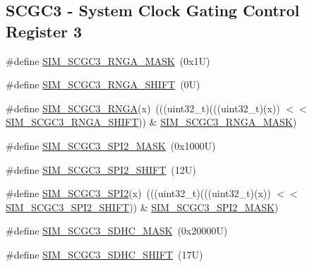 \subsection*{S\+C\+G\+C3 -\/ System Clock Gating Control Register 3}
\begin{DoxyCompactItemize}
\item 
\#define \mbox{\hyperlink{group___s_i_m___register___masks_ga0c6dcbbbc5311ca9a10130bfe2de165c}{S\+I\+M\+\_\+\+S\+C\+G\+C3\+\_\+\+R\+N\+G\+A\+\_\+\+M\+A\+SK}}~(0x1\+U)
\item 
\#define \mbox{\hyperlink{group___s_i_m___register___masks_ga998019751f05a8b543f2caf3f05fad17}{S\+I\+M\+\_\+\+S\+C\+G\+C3\+\_\+\+R\+N\+G\+A\+\_\+\+S\+H\+I\+FT}}~(0\+U)
\item 
\#define \mbox{\hyperlink{group___s_i_m___register___masks_gab1a4f54ac3f289370bd75ff60d01f64f}{S\+I\+M\+\_\+\+S\+C\+G\+C3\+\_\+\+R\+N\+GA}}(x)~(((uint32\+\_\+t)(((uint32\+\_\+t)(x)) $<$$<$ \mbox{\hyperlink{group___s_i_m___register___masks_ga998019751f05a8b543f2caf3f05fad17}{S\+I\+M\+\_\+\+S\+C\+G\+C3\+\_\+\+R\+N\+G\+A\+\_\+\+S\+H\+I\+FT}})) \& \mbox{\hyperlink{group___s_i_m___register___masks_ga0c6dcbbbc5311ca9a10130bfe2de165c}{S\+I\+M\+\_\+\+S\+C\+G\+C3\+\_\+\+R\+N\+G\+A\+\_\+\+M\+A\+SK}})
\item 
\#define \mbox{\hyperlink{group___s_i_m___register___masks_gab2d7534554a2c4f57d887acc3d78f872}{S\+I\+M\+\_\+\+S\+C\+G\+C3\+\_\+\+S\+P\+I2\+\_\+\+M\+A\+SK}}~(0x1000\+U)
\item 
\#define \mbox{\hyperlink{group___s_i_m___register___masks_ga49d1bb03182f3a731fcf50dffaa8a423}{S\+I\+M\+\_\+\+S\+C\+G\+C3\+\_\+\+S\+P\+I2\+\_\+\+S\+H\+I\+FT}}~(12\+U)
\item 
\#define \mbox{\hyperlink{group___s_i_m___register___masks_ga1a3215e158fcad9878851b3a67e6257d}{S\+I\+M\+\_\+\+S\+C\+G\+C3\+\_\+\+S\+P\+I2}}(x)~(((uint32\+\_\+t)(((uint32\+\_\+t)(x)) $<$$<$ \mbox{\hyperlink{group___s_i_m___register___masks_ga49d1bb03182f3a731fcf50dffaa8a423}{S\+I\+M\+\_\+\+S\+C\+G\+C3\+\_\+\+S\+P\+I2\+\_\+\+S\+H\+I\+FT}})) \& \mbox{\hyperlink{group___s_i_m___register___masks_gab2d7534554a2c4f57d887acc3d78f872}{S\+I\+M\+\_\+\+S\+C\+G\+C3\+\_\+\+S\+P\+I2\+\_\+\+M\+A\+SK}})
\item 
\#define \mbox{\hyperlink{group___s_i_m___register___masks_gac39a09b468d8bb54c31b9b470e53e26b}{S\+I\+M\+\_\+\+S\+C\+G\+C3\+\_\+\+S\+D\+H\+C\+\_\+\+M\+A\+SK}}~(0x20000\+U)
\item 
\#define \mbox{\hyperlink{group___s_i_m___register___masks_gab3bd17015713c00477953e717801d5bd}{S\+I\+M\+\_\+\+S\+C\+G\+C3\+\_\+\+S\+D\+H\+C\+\_\+\+S\+H\+I\+FT}}~(17\+U)

\end{DoxyCompactItemize}
